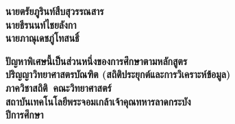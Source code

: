 
\thispagestyle{empty}
\begin{center}
  \vspace*{0.5in}

  \begin{minipage}{0.95\textwidth}\centering\sloppy
    {\fontsize{22pt}{30pt}\selectfont\bfseries\thesistitleTH\par}
  \end{minipage}

  \vspace{0.4cm}

  \begin{minipage}{0.95\textwidth}\centering\sloppy
    {\fontsize{22pt}{30pt}\selectfont\bfseries\MakeUppercase{\thesistitleEN}\par}
  \end{minipage}

  \vfill

  {\fontsize{20pt}{30pt}\selectfont\bfseries
    นายตรัยภูรินท์\hspace{1.5em}สืบสุวรรณสาร\\[2pt]
    นายธีรนนท์\hspace{1.5em}ไชยลังกา\\[2pt]
    นายภาณุเดช\hspace{1.5em}ภู่โทสนธิ์\par
  }

  \vfill

  \begin{minipage}{0.92\textwidth}\centering
    {\fontsize{20pt}{30pt}\selectfont\bfseries
      ปัญหาพิเศษนี้เป็นส่วนหนึ่งของการศึกษาตามหลักสูตร\\
      ปริญญาวิทยาศาสตรบัณฑิต (สถิติประยุกต์และการวิเคราะห์ข้อมูล)\\
      ภาควิชาสถิติ\ คณะวิทยาศาสตร์\\
      สถาบันเทคโนโลยีพระจอมเกล้าเจ้าคุณทหารลาดกระบัง\\
      ปีการศึกษา\ \academicyear\par
    }
  \end{minipage}

  \vspace*{0.5in}
\end{center}
\newpage

